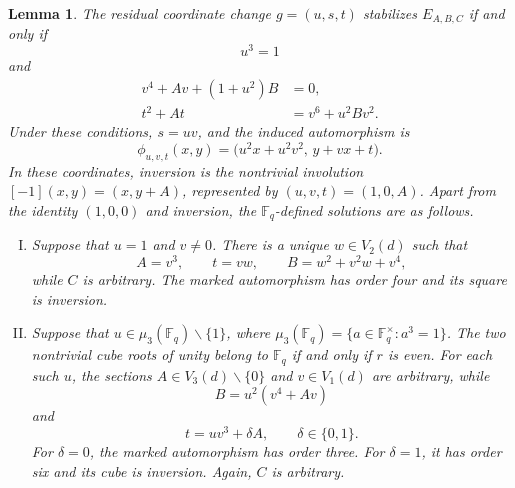 \documentclass[a4paper,12pt]{amsart}
\newtheorem{lem}[thm]{Lemma}
\theoremstyle{definition}
\newcommand{\Fb}{\mathbb{F}}
\renewcommand{\setminus}{\smallsetminus}
\begin{document}
\begin{lem}
\label{lem:char2-fixed-pair-classification}
The residual coordinate change $g=(u,s,t)$ stabilizes $E_{A,B,C}$ if and only if
\begin{equation}\label{eq:char2-u-condition}
u^3=1
\end{equation}
and
\begin{align}
v^4+Av+(1+u^2)B&=0,
\label{eq:char2-B-condition}\\
t^2+At&=v^6+u^2Bv^2.
\label{eq:char2-t-condition}
\end{align}
Under these conditions, $s=uv$, and the induced automorphism is
\begin{equation}\label{eq:char2-automorphism-map}
\phi_{u,v,t}(x,y)
=
\bigl(u^2x+u^2v^2,\,y+vx+t\bigr).
\end{equation}
In these coordinates, inversion is the nontrivial involution $[-1](x,y)=(x,y+A)$, represented by $(u,v,t)=(1,0,A)$.  Apart from the identity $(1,0,0)$ and inversion, the $\Fb_q$-defined solutions are as follows.

\begin{enumerate}[(I)]
\item Suppose that $u=1$ and $v\neq0$.  There is a unique $w\in V_2(d)$ such that
\begin{equation}\label{eq:char2-type-I}
A=v^3,
\qquad
t=vw,
\qquad
B=w^2+v^2w+v^4,
\end{equation}
while $C$ is arbitrary.  The marked automorphism has order four and its square is inversion.

\item Suppose that $u\in\mu_3(\Fb_q)\setminus\{1\}$, where $\mu_3(\Fb_q)=\{a\in\Fb_q^\times:a^3=1\}$.  The two nontrivial cube roots of unity belong to $\Fb_q$ if and only if $r$ is even.  For each such $u$, the sections $A\in V_3(d)\setminus\{0\}$ and $v\in V_1(d)$ are arbitrary, while
\begin{equation}\label{eq:char2-type-II-B}
B=u^2(v^4+Av)
\end{equation}
and
\begin{equation}\label{eq:char2-type-II-t}
t=uv^3+\delta A,
\qquad
\delta\in\{0,1\}.
\end{equation}
For $\delta=0$, the marked automorphism has order three.  For $\delta=1$, it has order six and its cube is inversion.  Again, $C$ is arbitrary.
\end{enumerate}
\end{lem}
\end{document}
